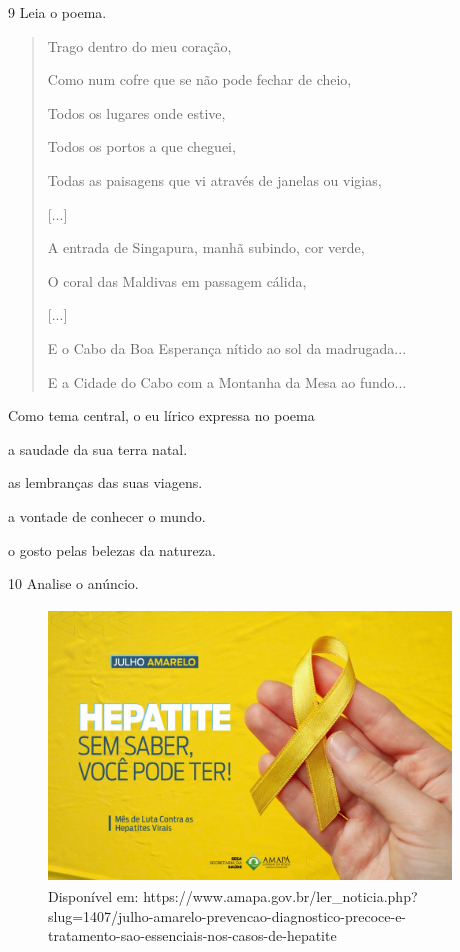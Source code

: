 \num{9} Leia o poema.

\begin{quote}
Trago dentro do meu coração,

Como num cofre que se não pode fechar de cheio,

Todos os lugares onde estive,

Todos os portos a que cheguei,

Todas as paisagens que vi através de janelas ou vigias,

{[}...{]}

A entrada de Singapura, manhã subindo, cor verde,

O coral das Maldivas em passagem cálida,

{[}...{]}

E o Cabo da Boa Esperança nítido ao sol da madrugada...

E a Cidade do Cabo com a Montanha da Mesa ao fundo...

\end{quote}

Como tema central, o eu lírico expressa no poema

\begin{escolha}
\item a saudade da sua terra natal.

\item as lembranças das suas viagens.

\item a vontade de conhecer o mundo.

\item o gosto pelas belezas da natureza.
\end{escolha}

\num{10} Analise o anúncio.

\begin{figure}
\centering
\includegraphics[width=4.21103in,height=2.86458in]{./imgSAEB_8_POR/media/image31.png}
\caption{Disponível em: https://www.amapa.gov.br/ler_noticia.php?slug=1407/julho-amarelo-prevencao-diagnostico-precoce-e-tratamento-sao-essenciais-nos-casos-de-hepatite}
\end{figure}

